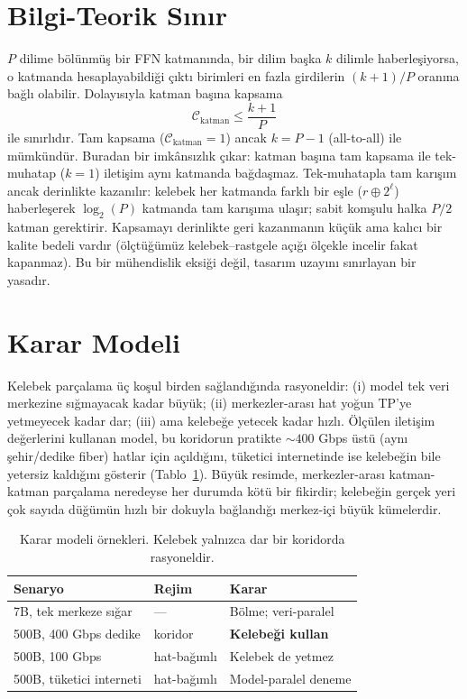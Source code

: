 \documentclass[10pt,journal]{IEEEtran}
\begin{document}
\section{Bilgi-Teorik Sınır}
\label{sec:sinir-teori}
$P$ dilime bölünmüş bir FFN katmanında, bir dilim başka $k$ dilimle haberleşiyorsa, o katmanda
hesaplayabildiği çıktı birimleri en fazla girdilerin $(k{+}1)/P$ oranına bağlı olabilir.
Dolayısıyla katman başına kapsama
\begin{equation}
\mathcal{C}_{\text{katman}} \le \frac{k+1}{P}
\end{equation}
ile sınırlıdır. Tam kapsama ($\mathcal{C}_{\text{katman}}{=}1$) ancak $k{=}P{-}1$ (all-to-all)
ile mümkündür. Buradan bir imkânsızlık çıkar: katman başına tam kapsama ile tek-muhatap ($k{=}1$)
iletişim aynı katmanda bağdaşmaz. Tek-muhatapla tam karışım ancak derinlikte kazanılır: kelebek
her katmanda farklı bir eşle ($r\oplus 2^\ell$) haberleşerek $\log_2(P)$ katmanda tam karışıma
ulaşır; sabit komşulu halka $P/2$ katman gerektirir. Kapsamayı derinlikte geri kazanmanın küçük
ama kalıcı bir kalite bedeli vardır (ölçtüğümüz kelebek--rastgele açığı ölçekle incelir fakat
kapanmaz). Bu bir mühendislik eksiği değil, tasarım uzayını sınırlayan bir yasadır.

\section{Karar Modeli}
Kelebek parçalama üç koşul birden sağlandığında rasyoneldir: (i) model tek veri merkezine
sığmayacak kadar büyük; (ii) merkezler-arası hat yoğun TP'ye yetmeyecek kadar dar; (iii) ama
kelebeğe yetecek kadar hızlı. Ölçülen iletişim değerlerini kullanan model, bu koridorun
pratikte $\sim\!400$ Gbps üstü (aynı şehir/dedike fiber) hatlar için açıldığını, tüketici
internetinde ise kelebeğin bile yetersiz kaldığını gösterir (Tablo~\ref{tab:karar}). Büyük
resimde, merkezler-arası katman-katman parçalama neredeyse her durumda kötü bir fikirdir;
kelebeğin gerçek yeri çok sayıda düğümün hızlı bir dokuyla bağlandığı merkez-içi büyük
kümelerdir.

\begin{table}[!t]
\centering
\footnotesize
\caption{Karar modeli örnekleri. Kelebek yalnızca dar bir koridorda rasyoneldir.}
\label{tab:karar}
\begin{tabular}{@{}p{3.2cm}p{1.6cm}p{2.4cm}@{}}
\toprule
Senaryo & Rejim & Karar \\
\midrule
7B, tek merkeze sığar    & ---          & Bölme; veri-paralel \\
500B, 400 Gbps dedike    & koridor      & \textbf{Kelebeği kullan} \\
500B, 100 Gbps           & hat-bağımlı  & Kelebek de yetmez \\
500B, tüketici interneti & hat-bağımlı  & Model-paralel deneme \\
\bottomrule
\end{tabular}
\end{table}
\end{document}
